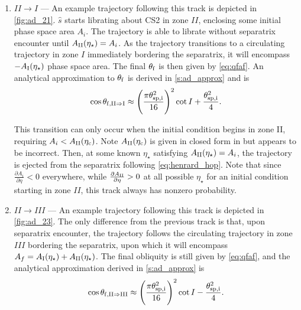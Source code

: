 \documentclass[
        fleqn,
        usenatbib,
        referee,
    ]{mnras}
\newcommand*{\pd}[2]{\frac{\partial#1}{\partial#2}}
\newcommand*{\p}[1]{\left(#1\right)}
\begin{document}
\begin{enumerate}
    \item $II \to I$ --- An example trajectory following this track is depicted
        in \autoref{fig:ad_21}. $\hat{s}$ starts librating about CS2 in zone
        $II$, enclosing some initial phase space area $A_i$. The trajectory is
        able to librate without separatrix encounter until $A_{\rm
        II}(\eta_\star) = A_i$. As the trajectory transitions to a circulating
        trajectory in zone $I$ immediately bordering the separatrix, it will
        encompass $-A_{\rm I}(\eta_\star)$ phase space area. The final
        $\theta_{\rm f}$ is then given by \autoref{eq:qfaf}. An analytical
        approximation to $\theta_{\rm f}$ is derived in \autoref{s:ad_approx}
        and is
        \begin{equation}
            \cos \theta_{\rm f, II \Rightarrow I} \approx
                \p{\frac{\pi \theta_{\rm sp, i}^2}{16}}^2 \cot I
                    + \frac{\theta_{\rm sp, i}^2}{4}.\label{eq:qf_21_approx}
        \end{equation}

        This transition can only occur when the initial condition begins in zone
        II, requiring $A_i < A_{\rm II}(\eta_{\rm c})$. Note $A_{\rm II}(\eta_{\rm c})$ is
        given in closed form in \citet{ward2004I} but appears to be incorrect.
        Then, at some known $\eta_\star$ satisfying $A_{\rm II}(\eta_\star) =
        A_i$, the trajectory is ejected from the separatrix following
        \autoref{eq:henrard_hop}. Note that since $\pd{A_i}{\eta} < 0$
        everywhere, while $\pd{A_{\rm II}}{\eta} > 0$ at all possible
        $\eta_\star$ for an initial condition starting in zone $II$, this track
        always has nonzero probability.

    \item $II \to III$ --- An example trajectory following this track is
        depicted in \autoref{fig:ad_23}. The only difference from the previous
        track is that, upon separatrix encounter, the trajectory follows the
        circulating trajectory in zone $III$ bordering the separatrix, upon
        which it will encompass $A_f = A_{\rm I}(\eta_\star) + A_{\rm
        II}(\eta_\star)$. The final obliquity is still given by
        \autoref{eq:qfaf}, and the analytical approximation derived in
        \autoref{s:ad_approx} is
        \begin{equation}
            \cos \theta_{\rm f, II \Rightarrow III} \approx
                \p{\frac{\pi \theta_{\rm sp, i}^2}{16}}^2 \cot I
                    - \frac{\theta_{\rm sp, i}^2}{4}.\label{eq:qf_23_approx}
        \end{equation}


\end{enumerate}
\end{document}
